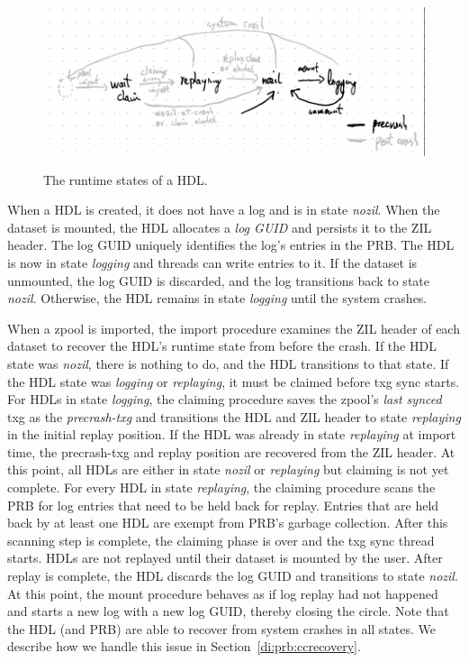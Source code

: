 \documentclass[12pt,a4paper,twoside]{book}
\begin{document}
{\begin{figure}[H]
    \centering
    \includegraphics[height=5cm]{fig/prb_hdl_runtime_states}
    \caption{The runtime states of a HDL.}
    \label{fig:prb_hdl_runtime_states}
\end{figure}

When a HDL is created, it does not have a log and is in state \textit{nozil}.
When the dataset is mounted, the HDL allocates a \textit{log GUID} and persists it to the ZIL header.
The log GUID uniquely identifies the log's entries in the PRB.
The HDL is now in state \textit{logging} and threads can write entries to it.
If the dataset is unmounted, the log GUID is discarded, and the log transitions back to state \textit{nozil}.
Otherwise, the HDL remains in state \textit{logging} until the system crashes.

When a zpool is imported, the import procedure examines the ZIL header of each dataset to recover the HDL's runtime state from before the crash.
If the HDL state was \textit{nozil}, there is nothing to do, and the HDL transitions to that state.
If the HDL state was \textit{logging} or \textit{replaying}, it must be claimed before txg sync starts.
For HDLs in state \textit{logging}, the claiming procedure saves the zpool's \textit{last synced} txg as the \textit{precrash-txg} and transitions the HDL and ZIL header to state \textit{replaying} in the initial replay position.
If the HDL was already in state \textit{replaying} at import time, the precrash-txg and replay position are recovered from the ZIL header.
At this point, all HDLs are either in state \textit{nozil} or \textit{replaying} but claiming is not yet complete.
For every HDL in state \textit{replaying}, the claiming procedure scans the PRB for log entries that need to be held back for replay.
Entries that are held back by at least one HDL are exempt from PRB's garbage collection.
After this scanning step is complete, the claiming phase is over and the txg sync thread starts.
HDLs are not replayed until their dataset is mounted by the user. %
After replay is complete, the HDL discards the log GUID and transitions to state \textit{nozil}.
At this point, the mount procedure behaves as if log replay had not happened and starts a new log with a new log GUID, thereby closing the circle.
Note that the HDL (and PRB) are able to recover from system crashes in all states.
We describe how we handle this issue in Section~\ref{di:prb:ccrecovery}.

}
\end{document}
